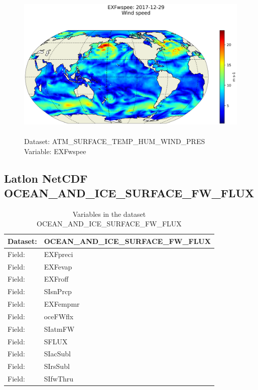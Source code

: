 \begin{figure}[H]
\centering
\includegraphics[scale=0.5]{../images/plots/latlon_plots/Atmosphere_Surface_Temperature_Humidity_Wind_and_Pressure/EXFwspee.png}
\caption{\\Dataset: ATM\_SURFACE\_TEMP\_HUM\_WIND\_PRES\\Variable: EXFwspee}
\label{tab:table-ATM_SURFACE_TEMP_HUM_WIND_PRES_EXFwspee-Plot}
\end{figure}
\pagebreak
\subsection{Latlon NetCDF OCEAN\_AND\_ICE\_SURFACE\_FW\_FLUX}
\newp
\begin{longtable}{|p{}|p{}|}
\caption{Variables in the dataset OCEAN\_AND\_ICE\_SURFACE\_FW\_FLUX}
\label{tab:table-OCEAN_AND_ICE_SURFACE_FW_FLUX-fields} \\ 
\hline \endhead \hline \endfoot
\rowcolor{lightgray} \textbf{Dataset:} & \textbf{OCEAN\_AND\_ICE\_SURFACE\_FW\_FLUX} \\ \hline
Field: &EXFpreci \\ \hline
Field: &EXFevap \\ \hline
Field: &EXFroff \\ \hline
Field: &SIsnPrcp \\ \hline
Field: &EXFempmr \\ \hline
Field: &oceFWflx \\ \hline
Field: &SIatmFW \\ \hline
Field: &SFLUX \\ \hline
Field: &SIacSubl \\ \hline
Field: &SIrsSubl \\ \hline
Field: &SIfwThru \\ \hline
\end{longtable}

